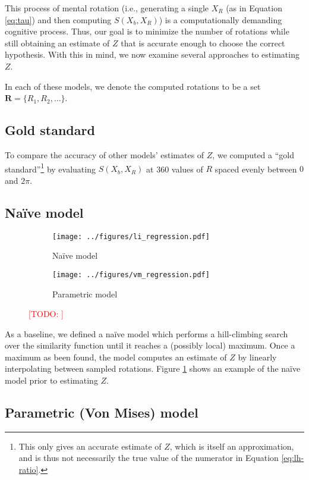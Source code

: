 \documentclass{article} %
\newcommand{\TODO}[1]{\textcolor{red}{[TODO: #1]}}
\begin{document}
This process of mental rotation (i.e., generating a single $X_R$ (as
in Equation \ref{eq:tau}) and then computing $S(X_b, X_R)$) is a
computationally demanding cognitive process. Thus, our goal is to
minimize the number of rotations while still obtaining an estimate of
$Z$ that is accurate enough to choose the correct hypothesis. With
this in mind, we now examine several approaches to estimating $Z$.

In each of these models, we denote the computed rotations to be a set
$\mathbf{R}=\{R_1, R_2, \ldots{}\}$.

\subsection{Gold standard}

To compare the accuracy of other models' estimates of $Z$, we computed
a ``gold standard''\footnote{This only gives an accurate estimate of
  $Z$, which is itself an approximation, and is thus not necessarily
  the true value of the numerator in Equation \ref{eq:lh-ratio}.} by
evaluating $S(X_b, X_R)$ at 360 values of $R$ spaced evenly between
$0$ and $2\pi$.

\subsection{Na\"ive model}

\begin{figure}[t]
  \centering
  \begin{subfigure}[b]{0.45\textwidth}
    \centering
    \texttt{[image: ../figures/li\_regression.pdf]}
    \caption{Na\"ive model}
    \label{fig:li}
  \end{subfigure}
  \begin{subfigure}[b]{0.45\textwidth}
    \centering
    \texttt{[image: ../figures/vm\_regression.pdf]}
    \caption{Parametric model}
    \label{fig:vm}
  \end{subfigure}
  \caption{\TODO{}}
\end{figure}

As a baseline, we defined a na\"ive model which performs a
hill-climbing search over the similarity function until it reaches a
(possibly local) maximum. Once a maximum as been found, the model
computes an estimate of $Z$ by linearly interpolating between sampled
rotations. Figure \ref{fig:li} shows an example of the na\"ive model
prior to estimating $Z$.

\subsection{Parametric (Von Mises) model}
\end{document}
